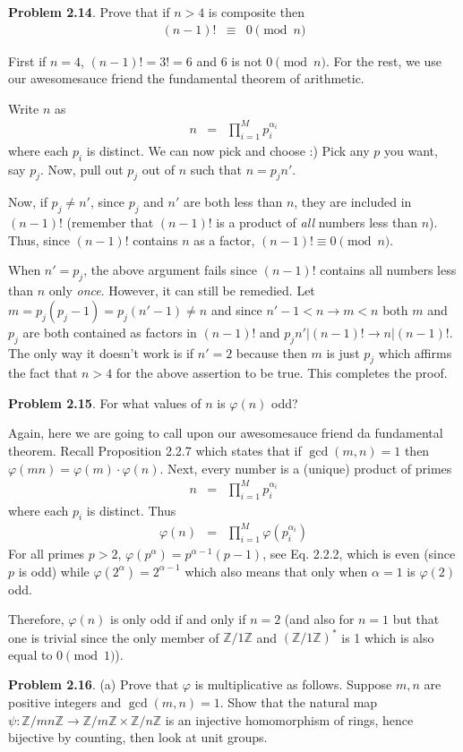 \documentclass[aps,preprint,preprintnumbers,nofootinbib,showpacs,prd]{revtex4-1}
\newcommand{\nbea}{\begin{eqnarray*}}
\newcommand{\neea}{\end{eqnarray*}}
\begin{document}
{\bf Problem 2.14}. Prove that if $n > 4$ is composite then
%
\nbea
(n-1)! & \equiv & 0 \pmod{n}
\neea
%

First if $n=4$, $(n-1)! = 3! = 6$ and 6 is not $0 \pmod{n}$. For the rest, we use our awesomesauce friend the fundamental theorem of arithmetic.

Write $n$ as
%
\nbea
n & = & \prod_{i=1}^{M} p_i^{\alpha_i}
\neea
%
where each $p_i$ is distinct. We can now pick and choose :) Pick any $p$ you want, say $p_j$. Now, pull out $p_j$ out of $n$ such that $n = p_j n'$.

Now, if $p_j \neq n'$, since $p_j$ and $n'$ are both less than $n$, they are included in $(n-1)!$ (remember that $(n-1)!$ is a product of {\it all} numbers less than $n$). Thus, since $(n-1)!$ contains $n$ as a factor, $(n-1)! \equiv 0 \pmod{n}$.

When $n' = p_j$, the above argument fails since $(n-1)!$ contains all numbers less than $n$ only {\it once}. However, it can still be remedied. Let $m=p_j(p_j-1) = p_j(n'-1) \neq n$ and since $n'-1<n \to m < n$ both $m$ and $p_j$ are both contained as factors in $(n-1)!$ and $p_j n'|(n-1)! \to n | (n-1)!$. The only way it doesn't work is if $n'=2$ because then $m$ is just $p_j$ which affirms the fact that $n > 4$ for the above assertion to be true. This completes the proof.

{\bf Problem 2.15}. For what values of $n$ is $\varphi(n)$ odd?

Again, here we are going to call upon our awesomesauce friend da fundamental theorem. Recall Proposition 2.2.7 which states that if $\gcd(m,n)=1$ then $\varphi(mn) = \varphi(m) \cdot \varphi(n)$. Next, every number is a (unique) product of primes
%
\nbea
n & = & \prod_{i=1}^{M} p_i^{\alpha_i}
\neea
%
where each $p_i$ is distinct. Thus
%
\nbea
\varphi(n) & = & \prod_{i=1}^{M} \varphi(p_i^{\alpha_i})
\neea
%
For all primes $p > 2$, $\varphi(p^\alpha) = p^{\alpha-1}(p-1)$, see Eq. 2.2.2, which is even (since $p$ is odd) while $\varphi(2^\alpha) = 2^{\alpha-1}$ which also means that only when $\alpha=1$ is $\varphi(2)$ odd.

Therefore, $\varphi(n)$ is only odd if and only if $n=2$ (and also for $n=1$ but that one is trivial since the only member of $\mathbb{Z}/1\mathbb{Z}$ and $(\mathbb{Z}/1\mathbb{Z})^*$ is 1 which is also equal to $0 \pmod{1}$).

{\bf Problem 2.16}.  (a) Prove that $\varphi$ is multiplicative as follows. Suppose $m, n$ are positive integers and $\gcd(m, n) = 1$. Show that the natural map $\psi : \mathbb{Z}/mn\mathbb{Z} \to \mathbb{Z}/m\mathbb{Z} \times \mathbb{Z}/n\mathbb{Z}$ is an injective homomorphism of rings, hence bijective by counting, then look at unit groups.
\end{document}
